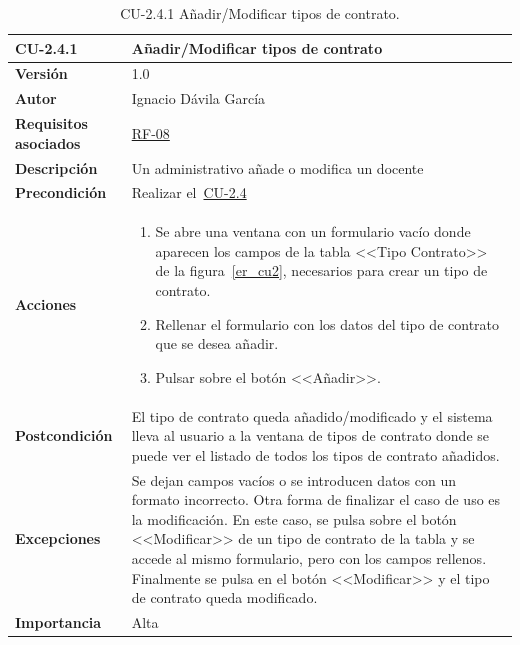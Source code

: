 \begin{table}[p]
\label{table:CU-2.4.1}
	\centering
	\begin{tabularx}{\linewidth}{ p{} p{} }
		\toprule
		\textbf{CU-2.4.1}    & \textbf{Añadir/Modificar tipos de contrato}\\
		\toprule
		\textbf{Versión}              & 1.0    \\
		\textbf{Autor}                & Ignacio Dávila García \\
		\textbf{Requisitos asociados} & \hyperref[itm:RF8]{RF-08} \\
		\textbf{Descripción}          & Un administrativo añade o modifica un docente \\
		\textbf{Precondición}         & Realizar el~\hyperref[table:CU-2.4]{CU-2.4} \\
		\textbf{Acciones}             &
		\begin{enumerate}
			\def\labelenumi{\arabic{enumi}.}
			\tightlist
			\item Se abre una ventana con un formulario vacío donde aparecen los campos de la tabla <<Tipo Contrato>> de la figura~\ref{er_cu2}, necesarios para crear un tipo de contrato.
			\item Rellenar el formulario con los datos del tipo de contrato que se desea añadir.
			\item Pulsar sobre el botón <<Añadir>>.
		\end{enumerate}\\
		\textbf{Postcondición}        & El tipo de contrato queda añadido/modificado y el sistema lleva al usuario a la ventana de tipos de contrato donde se puede ver el listado de todos los tipos de contrato añadidos. \\
		\textbf{Excepciones}          & Se dejan campos vacíos o se introducen datos con un formato incorrecto. Otra forma de finalizar el caso de uso es la modificación. En este caso, se pulsa sobre el botón <<Modificar>> de un tipo de contrato de la tabla y se accede al mismo formulario, pero con los campos rellenos. Finalmente se pulsa en el botón <<Modificar>> y el tipo de contrato queda modificado. \\
		\textbf{Importancia}          & Alta \\
		\bottomrule
	\end{tabularx}
	\caption{CU-2.4.1 Añadir/Modificar tipos de contrato.}
\end{table}
\FloatBarrier

